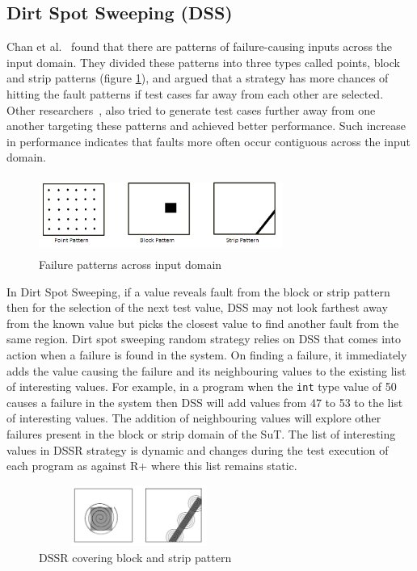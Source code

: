 \documentclass[conference]{IEEEtran}
\begin{document}
\subsection{Dirt Spot Sweeping (DSS)}
Chan et al.~\cite{Chan1996} found that there are patterns of failure-causing inputs across the input domain. They divided these patterns into three types called points, block and strip patterns (figure \ref{fig:patterns}), and argued that a strategy has more chances of hitting the fault patterns if test cases far away from each other are selected. Other researchers~\cite{Chan2002, Chen2003, Chen2005}, also tried to generate test cases further away from one another targeting these patterns and achieved better performance. Such increase in performance indicates that faults more often occur contiguous across the input domain. 
\begin{figure}[ht]                                    
\centering
\includegraphics[width= 8cm,height=2.5cm]{ART_Patterns.png}
\caption{Failure patterns across input domain~\cite{Chen2008}}
\label{fig:patterns}
\end{figure}
In Dirt Spot Sweeping, if a value reveals fault from the block or strip pattern then for the selection of the next test value, DSS may not look farthest away from the known value but picks the closest value to find another fault from the same region. Dirt spot sweeping random strategy relies on DSS that comes into action when a failure is found in the system. On finding a failure, it immediately adds the value causing the failure and its neighbouring values to the existing list of interesting values. For example, in a program when the \verb+int+ type value of 50 causes a failure in the system then DSS will add values from 47 to 53 to the list of interesting values. The addition of neighbouring values will explore other failures present in the block or strip domain of the SuT. The list of interesting values in DSSR strategy is dynamic and changes during the test execution of each program as against R+ where this list remains static.

\begin{figure}[ht]
\centering
\includegraphics[width=6.6cm,height=2cm]{block2.png}
\caption{DSSR covering block and strip pattern}
\label{fig:block2}
\end{figure}
\end{document}
